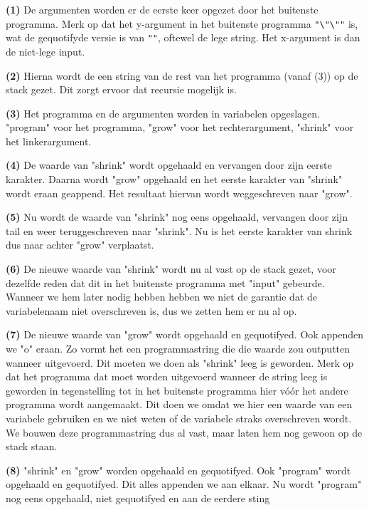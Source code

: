 \begin{description}
\item \textbf{(1)} De argumenten worden er de eerste keer opgezet door het buitenste
programma. Merk op dat het y-argument in het buitenste programma
\texttt{"\textbackslash"\textbackslash""} is, wat de gequotifyde versie is van
\texttt{""}, oftewel de lege string. Het x-argument is dan de niet-lege input.
\item \textbf{(2)} Hierna wordt de een string van de rest van het programma (vanaf
(3)) op de stack gezet. Dit zorgt ervoor dat recursie mogelijk is.
\item \textbf{(3)} Het programma en de argumenten worden in variabelen opgeslagen.
"program" voor het programma, "grow" voor het rechterargument, "shrink" voor
het linkerargument.
\item \textbf{(4)} De waarde van "shrink" wordt opgehaald en
vervangen door zijn eerste karakter. Daarna wordt "grow" opgehaald en het
eerste karakter van "shrink" wordt eraan geappend. Het resultaat hiervan wordt
weggeschreven naar "grow".
\item \textbf{(5)} Nu wordt de waarde van "shrink" nog
eens opgehaald, vervangen door zijn tail en weer teruggeschreven naar "shrink".
Nu is het eerste karakter van shrink dus naar achter "grow" verplaatst.
\item \textbf{(6)} De nieuwe waarde van "shrink" wordt nu al vast op de stack gezet,
voor dezelfde reden dat dit in het buitenste programma met "input" gebeurde.
Wanneer we hem later nodig hebben hebben we niet de garantie dat de
variabelenaam niet overschreven is, dus we zetten hem er nu al op.
\item \textbf{(7)} De nieuwe waarde van "grow" wordt opgehaald en gequotifyed. Ook
appenden we "o" eraan. Zo vormt het een programmastring die die waarde zou
outputten wanneer uitgevoerd. Dit moeten we doen als "shrink" leeg is geworden.
Merk op dat het programma dat moet worden uitgevoerd wanneer de string leeg is
geworden in tegenstelling tot in het buitenste programma hier v\'{o}\'{o}r het
andere programma wordt aangemaakt. Dit doen we omdat we hier een waarde van een
variabele gebruiken en we niet weten of de variabele straks overschreven wordt.
We bouwen deze programmastring dus al vast, maar laten hem nog gewoon op de
stack staan.
\item \textbf{(8)} "shrink" en "grow" worden opgehaald en gequotifyed.
Ook "program" wordt opgehaald en gequotifyed. Dit alles appenden we aan elkaar.
Nu wordt "program" nog eens opgehaald, niet gequotifyed en aan de eerdere sting

\end{description}
